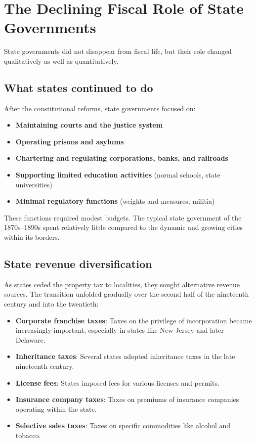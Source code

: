 \documentclass[12pt]{article}
\begin{document}
\section{The Declining Fiscal Role of State Governments}

State governments did not disappear from fiscal life, but their role changed qualitatively as well as quantitatively.

\subsection{What states continued to do}

After the constitutional reforms, state governments focused on:

\begin{itemize}
    \item \textbf{Maintaining courts and the justice system}
    \item \textbf{Operating prisons and asylums}
    \item \textbf{Chartering and regulating corporations, banks, and railroads}
    \item \textbf{Supporting limited education activities} (normal schools, state universities)
    \item \textbf{Minimal regulatory functions} (weights and measures, militia)
\end{itemize}

These functions required modest budgets.  The typical state government of the 1870s--1890s spent relatively little compared to the dynamic and growing cities within its borders.

\subsection{State revenue diversification}

As states ceded the property tax to localities, they sought alternative revenue sources.  The transition unfolded gradually over the second half of the nineteenth century and into the twentieth:

\begin{itemize}
    \item \textbf{Corporate franchise taxes}: Taxes on the privilege of incorporation became increasingly important, especially in states like New Jersey and later Delaware.
    \item \textbf{Inheritance taxes}: Several states adopted inheritance taxes in the late nineteenth century.
    \item \textbf{License fees}: States imposed fees for various licenses and permits.
    \item \textbf{Insurance company taxes}: Taxes on premiums of insurance companies operating within the state.
    \item \textbf{Selective sales taxes}: Taxes on specific commodities like alcohol and tobacco.
\end{itemize}
\end{document}
